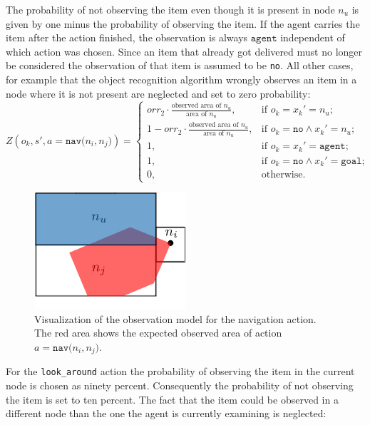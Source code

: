 The probability of not observing the item even though it is present in node $n_u$ is given by one minus the probability of observing the item. If the agent carries the item after the action finished, the observation is always $\texttt{agent}$ independent of which action was chosen. Since an item that already got delivered must no longer be considered the observation of that item is assumed to be \texttt{no}. All other cases, for example that the object recognition algorithm wrongly observes an item in a node where it is not present are neglected and set to zero probability: 
\begin{equation}\label{eq:Onav}
    Z(o_k, s', a=\texttt{nav($n_i, n_j$)}) = 
    \begin{cases}
        orr_2 \cdot \frac{\text{observed area of }n_u}{\text{area of }n_u}, & \text{if }o_k=x_k'=n_u ;\\
        1 - orr_2 \cdot \frac{\text{observed area of }n_u}{\text{area of }n_u}, & \text{if } o_k=\texttt{no}\land x_k'=n_u;\\
        1, & \text{if }o_k=x_k'=\texttt{agent};\\
        1, & \text{if }o_k=\texttt{no}\land x_k'=\texttt{goal};\\
        0, & \text{otherwise}.
    \end{cases}
\end{equation}
\begin{figure}
    \centering
    \includegraphics[width=0.5\textwidth]{Report/images/observationmodel.png}
    \caption{Visualization of the observation model for the navigation action. The red area shows the expected observed area of action $a=\texttt{nav($n_i, n_j$)}$.}
    \label{fig:obsmodel}
\end{figure}
For the \texttt{look\_around} action the probability of observing the item in the current node is chosen as ninety percent. Consequently the probability of not observing the item is set to ten percent. The fact that the item could be observed in a different node than the one the agent is currently examining is neglected:
